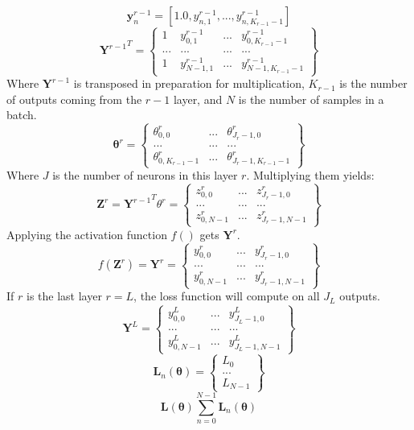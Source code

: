 \documentclass[]{article}
\begin{document}
\begin{equation} 
\textbf{y}^{r-1}_n = [1.0, y^{r-1}_{n,1}, ..., y_{n,K_{r-1}-1}^{r-1}]
\end{equation}
\[
{\textbf{Y}^{r-1}}^T = 
	\begin{Bmatrix}
	1 & y_{0,1}^{r-1} & ... & y_{0,K_{r-1} - 1}^{r-1}\\
	... & ... & ... & ...\\
	1 & y_{N -1,1}^{r-1} & ... & y_{N - 1,K_{r-1} - 1}^{r-1}
	\end{Bmatrix}
\]
Where $\textbf{Y}^{r-1}$ is transposed in preparation for multiplication, $K_{r-1}$ is the number of outputs coming from the $r-1$ layer, and $N$ is the number of samples in a batch.
\[
\boldsymbol{\theta}^r = 
	\begin{Bmatrix}
	\theta_{0,0}^r & ... & \theta_{J_r - 1,0}^r\\
	... & ... & ...\\
	\theta_{0,K_{r-1} - 1}^r & ... & \theta_{J_r - 1,K_{r-1} -1}^r
	\end{Bmatrix}
\]
Where $J$ is the number of neurons in this layer $r$.  Multiplying them yields:
\[
\textbf{Z}^r = {\textbf{Y}^{r-1}}^T \theta^r =
	\begin{Bmatrix}
	z_{0,0}^r & ... & z_{J_r-1,0}^r\\
	... & ... & ...\\
	z_{0,N-1}^r & ... & z_{J_r-1,N-1}^r
	\end{Bmatrix}
\]
Applying the activation function $f()$ gets $\textbf{Y}^r$.
\[
f(\textbf{Z}^r) = \textbf{Y}^r =
	\begin{Bmatrix}
	y_{0,0}^r & ... & y_{J_r-1,0}^r\\
	... & ... & ...\\
	y_{0,N-1}^r & ... & y_{J_r-1,N-1}^r
	\end{Bmatrix}
\]
If $r$ is the last layer $r = L$, the loss function will compute on all $J_L$ outputs.
\[
\textbf{Y}^L =
	\begin{Bmatrix}
	y_{0,0}^L & ... & y_{J_L-1,0}^L\\
	... & ... & ...\\
	y_{0,N-1}^L & ... & y_{J_L-1,N-1}^L
	\end{Bmatrix}
\]
\[
\textbf{L}_n(\boldsymbol{\theta}) =
	\begin{Bmatrix}
	L_0\\
	...\\
	L_{N-1}
	\end{Bmatrix}
\]
\begin{equation}
	\textbf{L}(\boldsymbol{\theta}) \sum_{n=0}^{N-1} \textbf{L}_n(\boldsymbol{\theta})
\end{equation}
\end{document}
